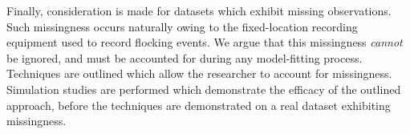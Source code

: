 \begin{center}
\begin{minipage}{0.9\textwidth}
    Finally, consideration is made for datasets which exhibit missing
    observations. Such missingness occurs naturally owing to the fixed-location
    recording equipment used to record flocking events. We argue that this
    missingness \emph{cannot} be ignored, and must be accounted for
    during any model-fitting process. Techniques are outlined which allow the
    researcher to account for missingness. Simulation studies are performed
    which demonstrate the efficacy of the outlined approach, before the
    techniques are demonstrated on a real dataset exhibiting missingness.

  \end{minipage}

\end{center}

\vspace*{\fill}

\cleardoublepage
